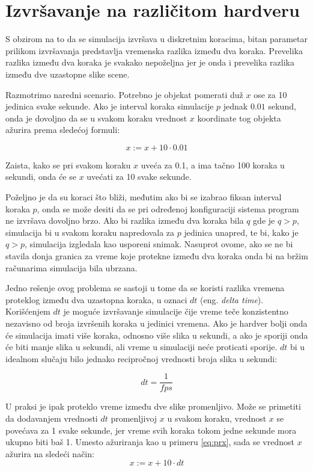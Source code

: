 \documentclass[12pt,oneside]{memoir}
\begin{document}
\section{Izvršavanje na različitom hardveru}

S obzirom na to da se simulacija izvršava u diskretnim koracima,
bitan parametar prilikom izvršavanja predstavlja vremenska razlika između dva koraka.
Prevelika razlika između dva koraka je svakako nepoželjna jer je onda i prevelika razlika između dve uzastopne slike scene.

Razmotrimo naredni scenario. Potrebno je objekat pomerati duž $x$ ose za 10 jedinica svake sekunde.
Ako je interval koraka simulacije 
$p$ jednak $0.01$ sekund, onda je dovoljno da se u svakom koraku vrednost $x$ koordinate tog objekta ažurira prema sledećoj formuli: \useshortskip

\begin{equation}
	x:= x + 10 \cdot 0.01
	\label{eq:prx}
\end{equation}

Zaista, kako se pri svakom koraku $x$ uveća za 0.1, a ima tačno 100 koraka u sekundi, onda će se $x$ uvećati za 10 svake sekunde.

Poželjno je da su koraci što bliži, međutim ako bi se izabrao fiksan interval koraka $p$, onda se može desiti
da se pri određenoj konfiguraciji sistema program ne izvršava dovoljno brzo. 
Ako bi razlika između dva koraka bila $q$ gde je $q > p$, 
simulacija bi u svakom koraku napredovala za $p$ jedinica unapred, te bi,
kako je $q > p$, simulacija izgledala kao usporeni snimak.
Nasuprot ovome, ako se ne bi stavila donja granica za vreme koje protekne između dva koraka onda bi na bržim računarima
simulacija bila ubrzana. 

Jedno rešenje ovog problema se sastoji u tome da se koristi 
razlika vremena proteklog između dva uzastopna koraka, u oznaci $dt$ (eng. {\em delta time}).
Korišćenjem $dt$ je moguće izvršavanje simulacije čije vreme teče konzistentno nezavisno od broja izvršenih koraka u 
jedinici vremena. Ako je hardver bolji onda će simulacija imati više koraka, odnosno više slika u sekundi, a ako je 
sporiji onda će biti manje slika u sekundi, ali vreme u simulaciji neće proticati sporije.
$dt$ bi u idealnom slučaju bilo jednako recipročnoj vrednosti broja slika u sekundi: 

$$dt = \frac{1}{fps}$$

U praksi je ipak proteklo vreme između dve slike promenljivo.
Može se primetiti da dodavanjem vrednosti $dt$ promenljivoj $x$ u svakom koraku, vrednost $x$ se povećava 
za 1 svake sekunde, jer vreme svih koraka tokom jedne sekunde mora ukupno biti baš 1.
Umesto ažuriranja kao u primeru \ref{eq:prx}, sada se vrednost $x$ ažurira na sledeći način:
\begin{equation}
	\label{eq:prx2}
	x:= x + 10 \cdot dt
\end{equation}
\end{document}
